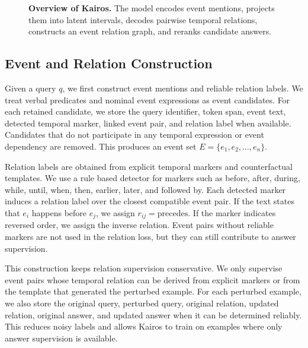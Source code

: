 \documentclass[11pt]{article}
\newcommand{\method}{Kairos}
\newcommand{\placeholder}[1]{%
\fbox{\begin{minipage}{0.92\linewidth}
\centering
\vspace{0.55cm}
\textcolor{gray}{#1}
\vspace{0.55cm}
\end{minipage}}}
\begin{document}
\begin{figure}[!t]
\centering
\placeholder{
Query and event mentions

Span pooled language model representations

Latent event interval projection

Geometry guided relation decoding

Event relation graph based answer scoring
}
\caption{\textbf{Overview of \method.} The model encodes event mentions, projects them into latent intervals, decodes pairwise temporal relations, constructs an event relation graph, and reranks candidate answers.}
\label{fig:framework}
\end{figure}

\subsection{Event and Relation Construction}

Given a query \(q\), we first construct event mentions and reliable relation labels. We treat verbal predicates and nominal event expressions as event candidates. For each retained candidate, we store the query identifier, token span, event text, detected temporal marker, linked event pair, and relation label when available. Candidates that do not participate in any temporal expression or event dependency are removed. This produces an event set \(E=\{e_1,e_2,\ldots,e_n\}\).

Relation labels are obtained from explicit temporal markers and counterfactual templates. We use a rule based detector for markers such as before, after, during, while, until, when, then, earlier, later, and followed by. Each detected marker induces a relation label over the closest compatible event pair. If the text states that \(e_i\) happens before \(e_j\), we assign \(r_{ij}=\mathrm{precedes}\). If the marker indicates reversed order, we assign the inverse relation. Event pairs without reliable markers are not used in the relation loss, but they can still contribute to answer supervision.

This construction keeps relation supervision conservative. We only supervise event pairs whose temporal relation can be derived from explicit markers or from the template that generated the perturbed example. For each perturbed example, we also store the original query, perturbed query, original relation, updated relation, original answer, and updated answer when it can be determined reliably. This reduces noisy labels and allows \method{} to train on examples where only answer supervision is available.
\end{document}
